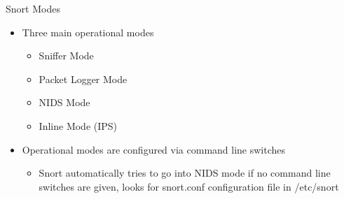 \begin{frame}[t]{Snort Modes}
  \fontsize{15}{18}\selectfont
  \vspace{0.15cm}
  \begin{itemize}
    \item Three main operational modes
    \begin{itemize}
      \item Sniffer Mode
      \item Packet Logger Mode
      \item NIDS Mode
      \item Inline Mode (IPS)
    \end{itemize}
    \item Operational modes are configured via command line switches
    \begin{itemize}
      \item Snort automatically tries to go into NIDS mode if no command line switches are given, looks for snort.conf configuration file in \textcolor{CommandGreen}{/etc/snort}
    \end{itemize}
  \end{itemize}
\end{frame}
